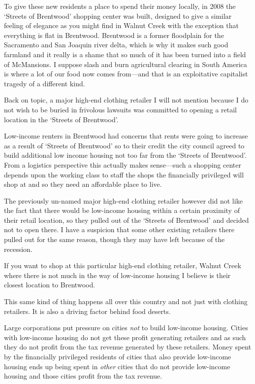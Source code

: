To give these new residents a place to spend their money locally, in 2008 the `Streets of Brentwood' shopping center was built, designed to give a similar feeling of elegance as you might find in Walnut Creek with the exception that everything is flat in Brentwood. Brentwood is a former floodplain for the Sacramento and San Joaquin river delta, which is why it makes such good farmland and it really is a shame that so much of it has been turned into a field of McMansions. I suppose slash and burn agricultural clearing in South America is where a lot of our food now comes from---and that is an exploitative capitalist tragedy of a different kind.

Back on topic, a major high-end clothing retailer I will not mention because I do not wish to be buried in frivolous lawsuits was committed to opening a retail location in the `Streets of Brentwood'.

Low-income renters in Brentwood had concerns that rents were going to increase as a result of `Streets of Brentwood' so to their credit the city council agreed to build additional low income housing not too far from the `Streets of Brentwood'. From a logistics perspective this actually makes sense---such a shopping center depends upon the working class to staff the shops the financially privileged will shop at and so they need an affordable place to live.

The previously un-named major high-end clothing retailer however did not like the fact that there would be low-income housing within a certain proximity of their retail location, so they pulled out of the `Streets of Brentwood' and decided not to open there. I have a suspicion that some other existing retailers there pulled out for the same reason, though they may have left because of the recession.

If you want to shop at this particular high-end clothing retailer, Walnut Creek where there is not much in the way of low-income housing I believe is their closest location to Brentwood.

This same kind of thing happens all over this country and not just with clothing retailers. It is also a driving factor behind food deserts.

Large corporations put pressure on cities \emph{not} to build low-income housing. Cities with low-income housing do not get these profit generating retailers and as such they do not profit from the tax revenue generated by these retailers. Money spent by the financially privileged residents of cities that also provide low-income housing ends up being spent in \emph{other} cities that do not provide low-income housing and those cities profit from the tax revenue.

